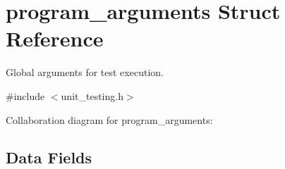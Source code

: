 \hypertarget{structprogram__arguments}{}\section{program\+\_\+arguments Struct Reference}
\label{structprogram__arguments}


Global arguments for test execution.  




{\ttfamily \#include $<$unit\+\_\+testing.\+h$>$}



Collaboration diagram for program\+\_\+arguments\+:
\subsection*{Data Fields}
